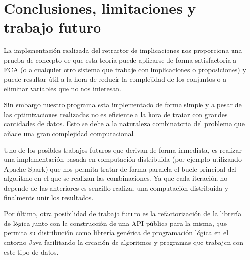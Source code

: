 
\chapter*{Conclusiones, limitaciones y trabajo futuro}

	La implementación realizada del retractor de implicaciones nos proporciona una prueba de concepto de que esta teoría puede aplicarse de forma satisfactoria a FCA (o a cualquier otro sistema que trabaje con implicaciones o proposiciones) y puede resultar útil a la hora de reducir la complejidad de los conjuntos o a eliminar variables que no nos interesan.
	
	Sin embargo nuestro programa esta implementado de forma simple y a pesar de las optimizaciones realizadas no es eficiente a la hora de tratar con grandes cantidades de datos. Esto se debe a la naturaleza combinatoria del problema que añade una gran complejidad computacional.	
	
	Uno de los posibles trabajos futuros que derivan de forma inmediata, es realizar una implementación basada en computación distribuida (por ejemplo utilizando Apache Spark) que nos permita tratar de forma paralela el bucle principal del algoritmo en el que se realizan las combinaciones. Ya que cada iteración no depende de las anteriores es sencillo realizar una computación distribuida y finalmente unir los resultados.

	
	Por último, otra posibilidad de trabajo futuro es la refactorización de la librería de lógica junto con la construcción de una API pública para la misma, que permita su distribución como librería genérica de programación lógica en el entorno Java facilitando la creación de algoritmos y programas que trabajen con este tipo de datos.
	
	